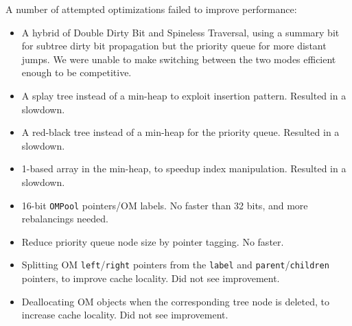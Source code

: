 A number of attempted optimizations
  failed to improve performance:
\begin{itemize}
\item A hybrid of Double Dirty Bit and Spineless Traversal,
    using a summary bit for subtree dirty bit propagation
    but the priority queue for more distant jumps.
  We were unable to make switching between the two modes
    efficient enough to be competitive.
\item A splay tree instead of a min-heap to exploit insertion pattern.
  Resulted in a slowdown.
\item A red-black tree instead of a min-heap for the priority queue.
  Resulted in a slowdown.
\item 1-based array in the min-heap, to speedup index manipulation.
  Resulted in a slowdown.
\item 16-bit \texttt{OMPool} pointers/OM labels.
  No faster than 32 bits, and more rebalancings needed.
\item Reduce priority queue node size
  by pointer tagging. No faster.
\item Splitting OM \texttt{left}/\texttt{right} pointers
  from the \texttt{label} and \texttt{parent}/\texttt{children} pointers, to improve cache locality. Did not see improvement.
\item Deallocating OM objects when the corresponding tree node is deleted, to increase cache locality. Did not see improvement.
\end{itemize}